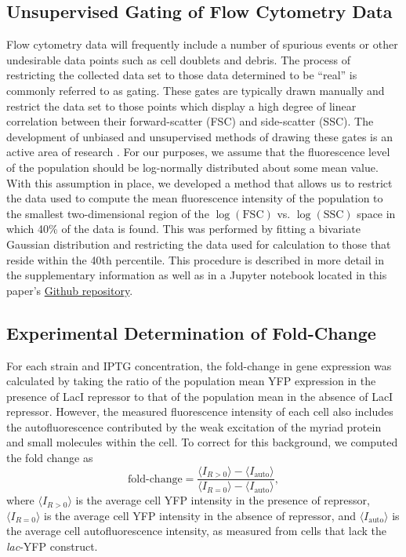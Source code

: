 \subsection*{Unsupervised Gating of Flow Cytometry Data}

Flow cytometry data will frequently include a number of spurious events or other
undesirable data points such as cell doublets and debris. The process of
restricting the collected data set to those data determined to be ``real'' is
commonly referred to as gating. These gates are typically drawn manually
\citep{Maecker2005} and restrict the data set to those points which display a
high degree of linear correlation between their forward-scatter (FSC) and
side-scatter (SSC). The development of unbiased and unsupervised methods of
drawing these gates is an active area of research \citep{Lo2008,
Aghaeepour2013}. For our purposes, we assume that the fluorescence level of the
population should be log-normally distributed about some mean value. With this
assumption in place, we developed a method that allows us to restrict the data
used to compute the mean fluorescence intensity of the population to the
smallest two-dimensional region of the $\log(\mathrm{FSC})$ vs.
$\log(\mathrm{SSC})$ space in which 40\% of the data is found. This was
performed by fitting a bivariate Gaussian distribution and restricting the data
used for calculation to those that reside within the 40th percentile. This
procedure is described in more detail in the supplementary information as well
as in a Jupyter notebook located in this paper's
\href{https://rpgroup-pboc.github.io/mwc_induction/code/notebooks/unsupervised_gating.html}{Github
repository}.

\subsection*{Experimental Determination of Fold-Change}

For each strain and IPTG concentration, the fold-change in gene expression was
calculated by taking the ratio of the population mean YFP expression in the
presence of LacI repressor to that of the population mean in the absence of LacI
repressor. However, the measured fluorescence intensity of each cell also
includes the autofluorescence contributed by the weak excitation of the myriad
protein and small molecules within the cell. To correct for this background, we
computed the fold change as
\begin{equation}
 \text{fold-change} = \frac{\langle I_{R > 0} \rangle - \langle I_\text{auto}\rangle}{\langle I_{R = 0} \rangle - \langle I_\text{auto}\rangle},
\end{equation}
where $\langle I_{R > 0}\rangle$ is the average cell YFP intensity in the
presence of repressor, $\langle I_{R = 0}\rangle$ is the average cell YFP
intensity in the absence of repressor, and $\langle I_\text{auto} \rangle$ is
the average cell autofluorescence intensity, as measured from cells that lack
the \textit{lac}-YFP construct.

